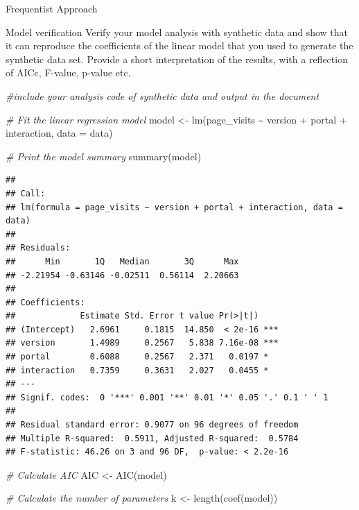 \documentclass[
  ignorenonframetext,
]{beamer}
\newenvironment{Shaded}{\begin{snugshade}}{\end{snugshade}}
\newcommand{\AttributeTok}[1]{\textcolor[rgb]{0.77,0.63,0.00}{#1}}
\newcommand{\CommentTok}[1]{\textcolor[rgb]{0.56,0.35,0.01}{\textit{#1}}}
\newcommand{\FunctionTok}[1]{\textcolor[rgb]{0.00,0.00,0.00}{#1}}
\newcommand{\NormalTok}[1]{#1}
\newcommand{\OtherTok}[1]{\textcolor[rgb]{0.56,0.35,0.01}{#1}}
\newcommand{\SpecialCharTok}[1]{\textcolor[rgb]{0.00,0.00,0.00}{#1}}
\begin{document}
\begin{frame}[fragile]{Frequentist Approach}
\protect\hypertarget{frequentist-approach-1}{}
\begin{block}{Model verification}
\protect\hypertarget{model-verification}{}
Verify your model analysis with synthetic data and show that it can
reproduce the coefficients of the linear model that you used to generate
the synthetic data set. Provide a short interpretation of the results,
with a reflection of AICc, F-value, p-value etc.

\begin{Shaded}
\begin{Highlighting}[]
\CommentTok{\#include your analysis code of synthetic data and output in the document}

\CommentTok{\# Fit the linear regression model}
\NormalTok{model }\OtherTok{\textless{}{-}} \FunctionTok{lm}\NormalTok{(page\_visits }\SpecialCharTok{\textasciitilde{}}\NormalTok{ version }\SpecialCharTok{+}\NormalTok{ portal }\SpecialCharTok{+}\NormalTok{ interaction, }\AttributeTok{data =}\NormalTok{ data)}

\CommentTok{\# Print the model summary}
\FunctionTok{summary}\NormalTok{(model)}
\end{Highlighting}
\end{Shaded}

\begin{verbatim}
## 
## Call:
## lm(formula = page_visits ~ version + portal + interaction, data = data)
## 
## Residuals:
##      Min       1Q   Median       3Q      Max 
## -2.21954 -0.63146 -0.02511  0.56114  2.20663 
## 
## Coefficients:
##             Estimate Std. Error t value Pr(>|t|)    
## (Intercept)   2.6961     0.1815  14.850  < 2e-16 ***
## version       1.4989     0.2567   5.838 7.16e-08 ***
## portal        0.6088     0.2567   2.371   0.0197 *  
## interaction   0.7359     0.3631   2.027   0.0455 *  
## ---
## Signif. codes:  0 '***' 0.001 '**' 0.01 '*' 0.05 '.' 0.1 ' ' 1
## 
## Residual standard error: 0.9077 on 96 degrees of freedom
## Multiple R-squared:  0.5911, Adjusted R-squared:  0.5784 
## F-statistic: 46.26 on 3 and 96 DF,  p-value: < 2.2e-16
\end{verbatim}

\begin{Shaded}
\begin{Highlighting}[]
\CommentTok{\# Calculate AIC}
\NormalTok{AIC }\OtherTok{\textless{}{-}} \FunctionTok{AIC}\NormalTok{(model)}

\CommentTok{\# Calculate the number of parameters}
\NormalTok{k }\OtherTok{\textless{}{-}} \FunctionTok{length}\NormalTok{(}\FunctionTok{coef}\NormalTok{(model))}


\end{Highlighting}
\end{Shaded}
\end{block}
\end{frame}
\end{document}
